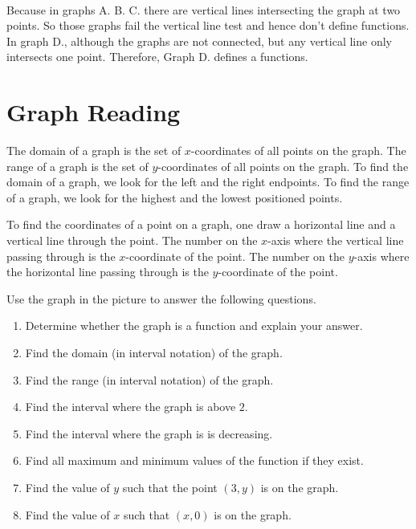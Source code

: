 \documentclass[
  en,11pt]{elegantbook}
\let\BeginKnitrBlock\begin \let\EndKnitrBlock\end
\begin{document}
\BeginKnitrBlock{solution}
{}\\

Because in graphs A. B. C. there are vertical lines intersecting the graph at two points. So those graphs fail the vertical line test and hence don't define functions. In graph D., although the graphs are not connected, but any vertical line only intersects one point. Therefore, Graph D. defines a functions.
\EndKnitrBlock{solution}

\hypertarget{graph-reading}{%
\section{Graph Reading}\label{graph-reading}}

The domain of a graph is the set of \(x\)-coordinates of all points on the graph. The range of a graph is the set of \(y\)-coordinates of all points on the graph. To find the domain of a graph, we look for the left and the right endpoints. To find the range of a graph, we look for the highest and the lowest positioned points.

To find the coordinates of a point on a graph, one draw a horizontal line and a vertical line through the point. The number on the \(x\)-axis where the vertical line passing through is the \(x\)-coordinate of the point. The number on the \(y\)-axis where the horizontal line passing through is the \(y\)-coordinate of the point.

\BeginKnitrBlock{example}
\protect\hypertarget{exm:unnamed-chunk-223}{}{\label{exm:unnamed-chunk-223} }
Use the graph in the picture to answer the following questions.

\begin{enumerate}
\def\labelenumi{\arabic{enumi}.}

\item
  Determine whether the graph is a function and explain your answer.
\item
  Find the domain (in interval notation) of the graph.
\item
  Find the range (in interval notation) of the graph.
\item
  Find the interval where the graph is above \(2\).
\item
  Find the interval where the graph is is decreasing.
\item
  Find all maximum and minimum values of the function if they exist.
\item
  Find the value of \(y\) such that the point \((3, y)\) is on the graph.
\item
  Find the value of \(x\) such that \((x, 0)\) is on the graph.
\end{enumerate}
\EndKnitrBlock{example}
\end{document}
